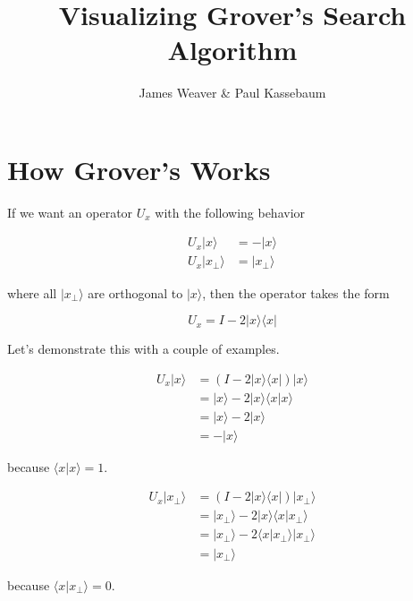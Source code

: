 \documentclass[12pt]{amsart}
\title{Visualizing Grover's Search Algorithm}
\author{James Weaver \& Paul Kassebaum}
\date{} %
\begin{document}
\maketitle

\section{How Grover's Works}

If we want an operator $U_x$ with the following behavior

\begin{equation}
	\begin{split}
		U_x |x\rangle & = - |x\rangle \\
		U_x |x_\perp\rangle & = |x_\perp\rangle 
	\end{split}
\end{equation}

where all $|x_\perp\rangle$ are orthogonal to $|x\rangle$, then the operator takes the form

\begin{equation}
	U_x = I - 2 |x\rangle\langle x|
\end{equation}

Let's demonstrate this with a couple of examples.

\begin{equation}
	\begin{split}
		U_x |x\rangle & = (I - 2 |x\rangle\langle x| ) |x\rangle \\
		& = |x\rangle - 2 |x\rangle\langle x | x\rangle \\
		& = |x\rangle - 2 |x\rangle \\
		& = - |x\rangle
	\end{split}
\end{equation}

because $\langle x | x\rangle = 1$.

\begin{equation}
	\begin{split}
		U_x |x_\perp\rangle & = (I - 2 |x\rangle\langle x| ) |x_\perp\rangle \\
		& = |x_\perp\rangle - 2 |x\rangle\langle x | x_\perp\rangle \\
		& = |x_\perp\rangle - 2 \langle x | x_\perp\rangle  |x_\perp\rangle \\
		& = |x_\perp\rangle
	\end{split}
\end{equation}

because $\langle x | x_\perp\rangle = 0$.
\end{document}
